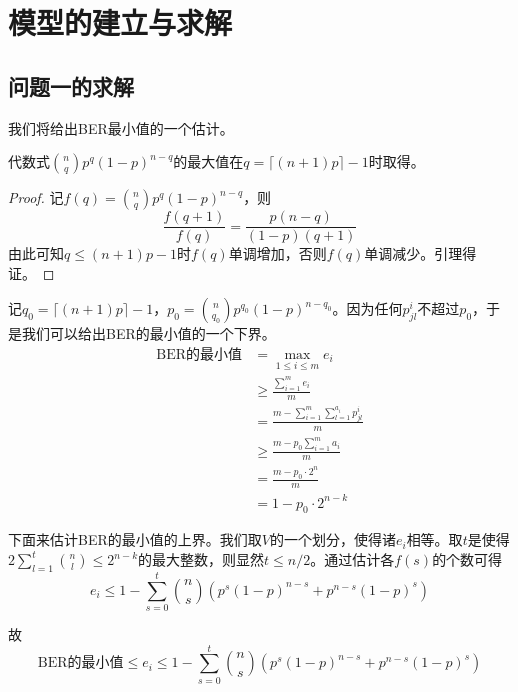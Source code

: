 \section{模型的建立与求解}

\subsection{问题一的求解}

我们将给出BER最小值的一个估计。

\begin{lemma}
代数式$\binom{n}{q}p^q(1-p)^{n-q}$的最大值在$q=\lceil (n+1)p\rceil-1$时取得。
\end{lemma}
\begin{proof}
记$f(q)=\binom{n}{q}p^q(1-p)^{n-q}$，则
$$
\frac{f(q+1)}{f(q)}=\frac{p(n-q)}{(1-p)(q+1)}
$$
由此可知$q\le (n+1)p-1$时$f(q)$单调增加，否则$f(q)$单调减少。引理得证。
\end{proof}

记$q_0=\lceil (n+1)p\rceil-1$，$p_0=\binom{n}{q_0}p^{q_0}(1-p)^{n-q_0}$。因为任何$p^i_{jl}$不超过$p_0$，于是我们可以给出BER的最小值的一个下界。
\begin{align*}
    \mathrm{BER}\text{的最小值}&=\max_{1\le i\le m}e_i\\
    &\ge\frac{\sum_{i=1}^m e_i}{m}\\
    &=\frac{m-\sum_{i=1}^m\sum_{l=1}^{a_i}p^i_{jl}}{m}\\
    &\ge\frac{m-p_0\sum_{i=1}^m a_i}{m}\\
    &=\frac{m-p_0\cdot2^n}{m}\\
    &=1-p_0\cdot 2^{n-k}
\end{align*}

下面来估计BER的最小值的上界。我们取$V$的一个划分，使得诸$e_i$相等。取$t$是使得$2\sum_{l=1}^t\binom{n}{l}\le 2^{n-k}$的最大整数，则显然$t\le n/2$。通过估计各$f(s)$的个数可得
$$
e_i\le 1-\sum_{s=0}^t\binom{n}{s}\left(p^s(1-p)^{n-s}+p^{n-s}(1-p)^s\right)
$$

故
$$
\mathrm{BER}\text{的最小值}\le e_i\le 1-\sum_{s=0}^t\binom{n}{s}\left(p^s(1-p)^{n-s}+p^{n-s}(1-p)^s\right)
$$
